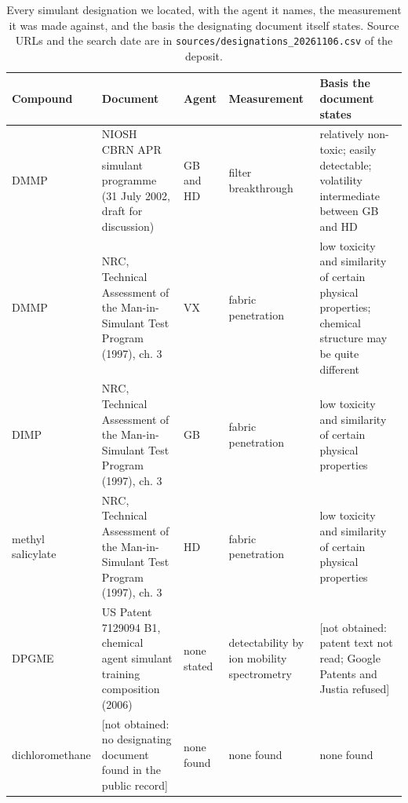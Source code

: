\begin{table}[htb]
\centering
\caption{Every simulant designation we located, with the agent it names, the measurement it was made against, and the basis the designating document itself states. Source URLs and the search date are in \texttt{sources/designations\_20261106.csv} of the deposit.}
\label{tab:designations}
\footnotesize
\begin{tabular}{p{1.9cm}p{3.4cm}p{1.5cm}p{2.3cm}p{4.2cm}}
\hline
Compound & Document & Agent & Measurement & Basis the document states \\
\hline
DMMP & NIOSH CBRN APR simulant programme (31 July 2002, draft for discussion) & GB and HD & filter breakthrough & relatively non-toxic; easily detectable; volatility intermediate between GB and HD \\
DMMP & NRC, Technical Assessment of the Man-in-Simulant Test Program (1997), ch. 3 & VX & fabric penetration & low toxicity and similarity of certain physical properties; chemical structure may be quite different \\
DIMP & NRC, Technical Assessment of the Man-in-Simulant Test Program (1997), ch. 3 & GB & fabric penetration & low toxicity and similarity of certain physical properties \\
methyl salicylate & NRC, Technical Assessment of the Man-in-Simulant Test Program (1997), ch. 3 & HD & fabric penetration & low toxicity and similarity of certain physical properties \\
DPGME & US Patent 7129094 B1, chemical agent simulant training composition (2006) & none stated & detectability by ion mobility spectrometry & [not obtained: patent text not read; Google Patents and Justia refused] \\
dichloromethane & [not obtained: no designating document found in the public record] & none found & none found & none found \\
\hline
\end{tabular}
\end{table}

